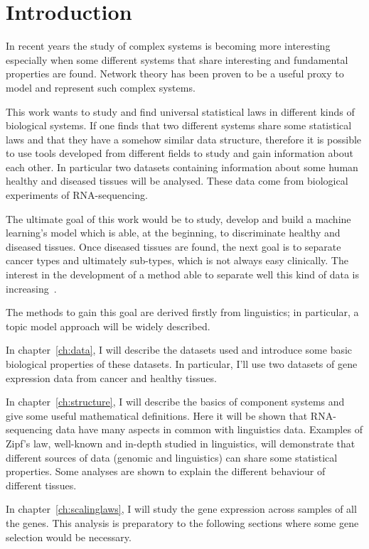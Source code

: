 \chapter*{Introduction}\label{ch:intro}
In recent years the study of complex systems is becoming more interesting especially when some different systems that share interesting and fundamental properties are found. Network theory has been proven to be a useful proxy to model and represent such complex systems.

This work wants to study and find universal statistical laws in different kinds of biological systems. If one finds that two different systems share some statistical laws and that they have a somehow similar data structure, therefore it is possible to use tools developed from different fields to study and gain information about each other. In particular two datasets containing information about some human healthy and diseased tissues will be analysed. These data come from biological experiments of RNA-sequencing.

The ultimate goal of this work would be to study, develop and build a machine learning's model which is able, at the beginning, to discriminate healthy and diseased tissues. Once diseased tissues are found, the next goal is to separate cancer types and ultimately sub-types, which is not always easy clinically. The interest in the development of a method able to separate well this kind of data is increasing~\cite{Farver2018}.

The methods to gain this goal are derived firstly from linguistics; in particular, a topic model approach will be widely described.

In chapter~\ref{ch:data}, I will describe the datasets used and introduce some basic biological properties of these datasets. In particular, I'll use two datasets of gene expression data from cancer and healthy tissues.

In chapter~\ref{ch:structure}, I will describe the basics of component systems and give some useful mathematical definitions. Here it will be shown that RNA-sequencing data have many aspects in common with linguistics data. Examples of Zipf's law, well-known and in-depth studied in linguistics, will demonstrate that different sources of data (genomic and linguistics) can share some statistical properties. Some analyses are shown to explain the different behaviour of different tissues.

In chapter~\ref{ch:scalinglaws}, I will study the gene expression across samples of all the genes. This analysis is preparatory to the following sections where some gene selection would be necessary.

